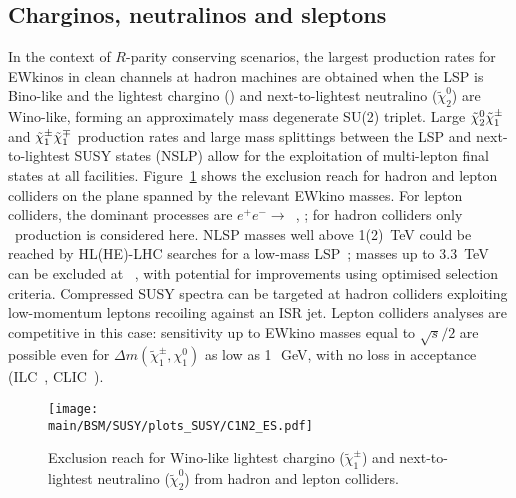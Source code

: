 \documentclass[../report.tex]{subfiles}
\providecommand{\main}{..}
\begin{document}
\subsection{Charginos, neutralinos and sleptons}
\label{sec:BSM-SUSY-weak}

In the context of $R$-parity conserving scenarios, the largest production rates for EWkinos in clean channels at hadron machines are obtained when the LSP is Bino-like and the lightest chargino (\chiOnePM) and next-to-lightest neutralino ($\tilde \chi_2^0$) are Wino-like, forming an approximately mass degenerate SU(2) triplet. 
Large $\tilde{\chi}_{2}^{0}\tilde{\chi}_1^\pm$ and $\tilde{\chi}_1^\pm\tilde{\chi}_1^\mp$ production rates and large mass splittings between the LSP and next-to-lightest SUSY states (NSLP) allow for the exploitation of multi-lepton final states at all facilities.
Figure~\ref{fig:SUSY_Winos} shows the exclusion reach for hadron and lepton colliders on the plane spanned by the relevant EWkino masses. For lepton colliders, the dominant processes are $e^+e^- \to$~\chiOnePM\chiOneMP, \chiTwoZero\chiOneZero; for hadron colliders only \chiTwoZero\chiOnePM ~production is considered here.
NLSP masses well above 1(2)~TeV could be reached by HL(HE)-LHC searches for a low-mass LSP~\cite{CidVidal:2018eel}; masses up to 3.3~TeV can be excluded at \FCChh~\cite{Golling:2016gvc}, with potential for improvements using optimised  selection criteria. Compressed SUSY spectra can be targeted at hadron colliders exploiting low-momentum leptons recoiling against an ISR jet. Lepton colliders analyses are competitive in this case: sensitivity up to EWkino masses equal to $\sqrt{s}/2$ are possible even for $\Delta m(\tilde{\chi}_{1}^{\pm}, \chi_1^0)$ as low as 1~\,GeV, with no loss in acceptance (ILC~\cite{Antusch:2017pkq}, CLIC~\cite{deBlas:2018mhx}).

\begin{figure}[htb]
    \centering
\texttt{[image: \\main/BSM/SUSY/plots\_SUSY/C1N2\_ES.pdf]}
    \caption{
    Exclusion reach for Wino-like lightest chargino (${\tilde \chi}_1^\pm$) and next-to-lightest neutralino (${\tilde \chi}_2^0$) from hadron and lepton colliders. %
    }
\label{fig:SUSY_Winos}
\end{figure}
\end{document}
